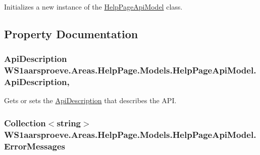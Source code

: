 Initializes a new instance of the \hyperlink{class_w_s1aarsproeve_1_1_areas_1_1_help_page_1_1_models_1_1_help_page_api_model}{Help\+Page\+Api\+Model} class. 



\subsection{Property Documentation}
\hypertarget{class_w_s1aarsproeve_1_1_areas_1_1_help_page_1_1_models_1_1_help_page_api_model_aa8a3ac8bc355b4dd059e05300678b753}{}
\subsubsection[{Api\+Description}]{\setlength{\rightskip}{0pt plus 5cm}Api\+Description W\+S1aarsproeve.\+Areas.\+Help\+Page.\+Models.\+Help\+Page\+Api\+Model.\+Api\+Description\hspace{0.3cm}{\ttfamily [get]}, {\ttfamily [set]}}\label{class_w_s1aarsproeve_1_1_areas_1_1_help_page_1_1_models_1_1_help_page_api_model_aa8a3ac8bc355b4dd059e05300678b753}


Gets or sets the \hyperlink{class_w_s1aarsproeve_1_1_areas_1_1_help_page_1_1_models_1_1_help_page_api_model_aa8a3ac8bc355b4dd059e05300678b753}{Api\+Description} that describes the A\+P\+I. 

\hypertarget{class_w_s1aarsproeve_1_1_areas_1_1_help_page_1_1_models_1_1_help_page_api_model_a6357b04fa16617e666a6498e4679ac6c}{}
\subsubsection[{Error\+Messages}]{\setlength{\rightskip}{0pt plus 5cm}Collection$<$string$>$ W\+S1aarsproeve.\+Areas.\+Help\+Page.\+Models.\+Help\+Page\+Api\+Model.\+Error\+Messages\hspace{0.3cm}{\ttfamily [get]}}\label{class_w_s1aarsproeve_1_1_areas_1_1_help_page_1_1_models_1_1_help_page_api_model_a6357b04fa16617e666a6498e4679ac6c}



